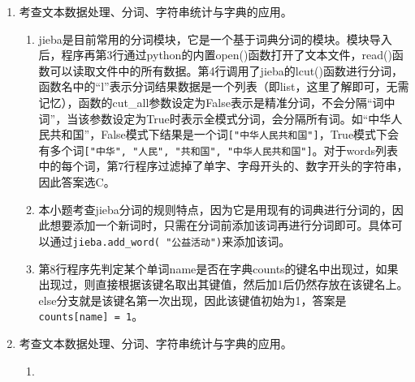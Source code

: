 \begin{enumerate}
\item 考查文本数据处理、分词、字符串统计与字典的应用。
	\begin{enumerate}[label=$(\arabic*)$]
\setcounter{qnumber}{1}
\begin{lstlisting}[numbers=left]
import jieba                                     # 导入jieba模块
import pandas as pd
text = open("news.txt", encoding="utf-8").read() # 打开文本文件
words = jieba.lcut(text, cut_all=False)          # 分词
counts = {}
for name in words:
    if len(name) != 1 and not ("a" < name[0] < "z") and not ("0" < name[0] < "9"):
        if name in counts:
            counts[name] += 1                    # 词语已出现过
        else:
            counts[name] = 1                     # 词语第一次出现
# 字典转化为DataFrame格式存储
df = pd.DataFrame(list(counts.items()), columns=["词", "次数"])
df = df.sort_values("次数", ascending=False)     # 按“次数”降序排序
print(df)
\end{lstlisting}
	\item jieba是目前常用的分词模块，它是一个基于词典分词的模块。模块导入后，程序再第3行通过python的内置open()函数打开了文本文件，read()函数可以读取文件中的所有数据。第4行调用了jieba的lcut()函数进行分词，函数名中的“l”表示分词结果数据是一个列表（即list，这里了解即可，无需记忆），函数的cut\_all参数设定为False表示是精准分词，不会分隔“词中词”，当该参数设定为True时表示全模式分词，会分隔所有词。如“中华人民共和国”，False模式下结果是一个词\lstinline|["中华人民共和国"]|，True模式下会有多个词\lstinline|["中华", "人民", "共和国", "中华人民共和国"]|。对于words列表中的每个词，第7行程序过滤掉了单字、字母开头的、数字开头的字符串，因此答案选C。
	\item 本小题考查jieba分词的规则特点，因为它是用现有的词典进行分词的，因此想要添加一个新词时，只需在分词前添加该词再进行分词即可。具体可以通过\lstinline|jieba.add_word( "公益活动")|来添加该词。
	\item 第8行程序先判定某个单词name是否在字典counts的键名中出现过，如果出现过，则直接根据该键名取出其键值，然后加1后仍然存放在该键名上。else分支就是该键名第一次出现，因此该键值初始为1，答案是\lstinline|counts[name] = 1|。
	\end{enumerate}


\item 考查文本数据处理、分词、字符串统计与字典的应用。
	\begin{enumerate}[label=$(\arabic*)$]
\setcounter{qnumber}{1}
\begin{lstlisting}[numbers=left]

\end{lstlisting}
	\item 
	\end{enumerate}











\end{enumerate}


\newpage
